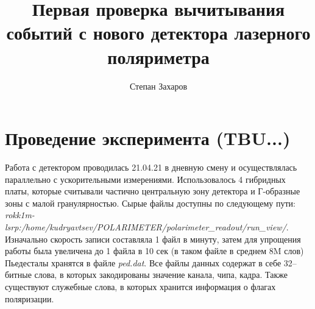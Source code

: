 \documentclass[12pt]{article}
\title{Первая проверка вычитывания событий с нового детектора лазерного поляриметра}
\author{Степан Захаров}
\begin{document}
\maketitle

\vspace{-3em} 

\section{Проведение эксперимента (TBU...)}
Работа с детектором проводилась 21.04.21 в дневную смену и осуществлялась параллельно с ускорительными измерениями. Использовалось 4 гибридных платы, которые считывали частично центральную зону детектора и Г-образные зоны с малой гранулярностью. Сырые файлы доступны по следующему пути: \\\textit{rokk1m-lsrp:/home/kudryavtsev/POLARIMETER/polarimeter\_readout/run\_view/}.\\Изначально скорость записи составляла 1 файл в минуту, затем для упрощения работы была увеличена до 1 файла в 10 сек (в таком файле в среднем 8M слов) Пьедесталы хранятся в файле \textit{ped.dat}. Все файлы данных содержат в себе 32--битные слова, в которых закодированы значение канала, чипа, кадра. Также существуют служебные слова, в которых хранится информация о флагах поляризации. 
\end{document}

